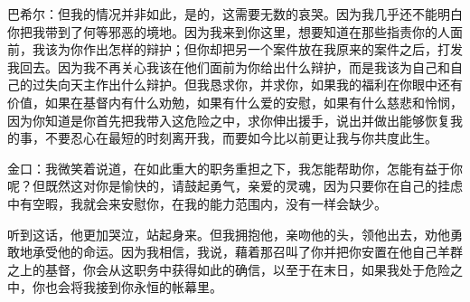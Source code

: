 巴希尔：但我的情况并非如此，是的，这需要无数的哀哭。因为我几乎还不能明白你把我带到了何等邪恶的境地。因为我来到你这里，想要知道在那些指责你的人面前，我该为你作出怎样的辩护；但你却把另一个案件放在我原来的案件之后，打发我回去。因为我不再关心我该在他们面前为你给出什么辩护，而是我该为自己和自己的过失向天主作出什么辩护。但我恳求你，并求你，如果我的福利在你眼中还有价值，如果在基督内有什么劝勉，如果有什么爱的安慰，如果有什么慈悲和怜悯，因为你知道是你首先把我带入这危险之中，求你伸出援手，说出并做出能够恢复我的事，不要忍心在最短的时刻离开我，而要如今比以前更让我与你共度此生。\par

金口：我微笑着说道，在如此重大的职务重担之下，我怎能帮助你，怎能有益于你呢？但既然这对你是愉快的，请鼓起勇气，亲爱的灵魂，因为只要你在自己的挂虑中有空暇，我就会来安慰你，在我的能力范围内，没有一样会缺少。\par

听到这话，他更加哭泣，站起身来。但我拥抱他，亲吻他的头，领他出去，劝他勇敢地承受他的命运。因为我相信，我说，藉着那召叫了你并把你安置在他自己羊群之上的基督，你会从这职务中获得如此的确信，以至于在末日，如果我处于危险之中，你也会将我接到你永恒的帐幕里。\par

